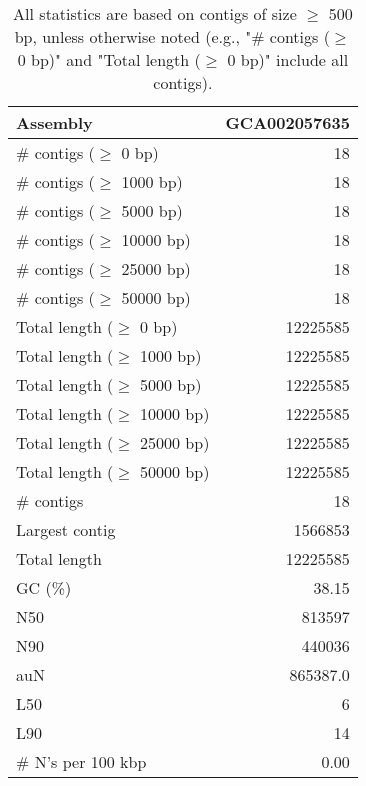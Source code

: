 \documentclass[12pt,a4paper]{article}
\begin{document}
\begin{table}[ht]
\begin{center}
\caption{All statistics are based on contigs of size $\geq$ 500 bp, unless otherwise noted (e.g., "\# contigs ($\geq$ 0 bp)" and "Total length ($\geq$ 0 bp)" include all contigs).}
\begin{tabular}{|l*{1}{|r}|}
\hline
Assembly & GCA002057635 \\ \hline
\# contigs ($\geq$ 0 bp) & 18 \\ \hline
\# contigs ($\geq$ 1000 bp) & 18 \\ \hline
\# contigs ($\geq$ 5000 bp) & 18 \\ \hline
\# contigs ($\geq$ 10000 bp) & 18 \\ \hline
\# contigs ($\geq$ 25000 bp) & 18 \\ \hline
\# contigs ($\geq$ 50000 bp) & 18 \\ \hline
Total length ($\geq$ 0 bp) & 12225585 \\ \hline
Total length ($\geq$ 1000 bp) & 12225585 \\ \hline
Total length ($\geq$ 5000 bp) & 12225585 \\ \hline
Total length ($\geq$ 10000 bp) & 12225585 \\ \hline
Total length ($\geq$ 25000 bp) & 12225585 \\ \hline
Total length ($\geq$ 50000 bp) & 12225585 \\ \hline
\# contigs & 18 \\ \hline
Largest contig & 1566853 \\ \hline
Total length & 12225585 \\ \hline
GC (\%) & 38.15 \\ \hline
N50 & 813597 \\ \hline
N90 & 440036 \\ \hline
auN & 865387.0 \\ \hline
L50 & 6 \\ \hline
L90 & 14 \\ \hline
\# N's per 100 kbp & 0.00 \\ \hline
\end{tabular}
\end{center}
\end{table}
\end{document}
